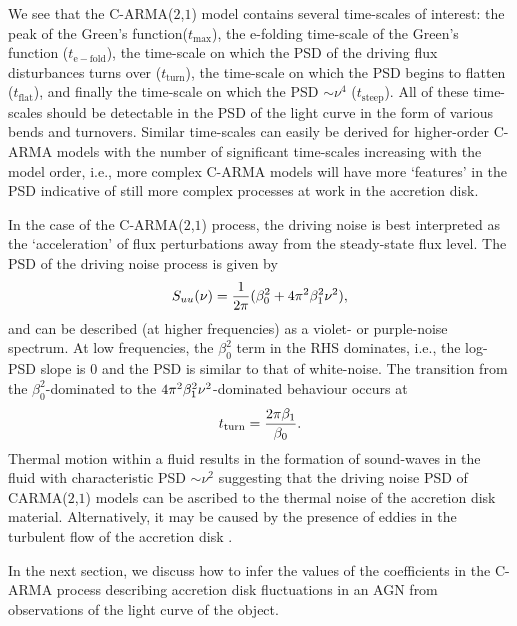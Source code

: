 \documentclass[a4paper,fleqn,usenatbib]{mnras}
\begin{document}
We see that the C-ARMA($2$,$1$) model contains several time-scales of interest: the peak of the Green's function($t_{\mathrm{max}}$), the e-folding time-scale of the Green's function ($t_{\mathrm{e-fold}}$), the time-scale on which the PSD of the driving flux disturbances turns over ($t_{\mathrm{turn}}$), the time-scale on which the PSD begins to flatten ($t_{\mathrm{flat}}$), and finally the time-scale on which the PSD $\sim \nu^{4}$ ($t_{\mathrm{steep}}$). All of these time-scales should be detectable in the PSD of the light curve in the form of various bends and turnovers. Similar time-scales can easily be derived for higher-order C-ARMA models with the number of significant time-scales increasing with the model order, i.e., more complex C-ARMA models will have more `features' in the PSD indicative of still more complex processes at work in the accretion disk.

In the case of the C-ARMA($2$,$1$) process, the driving noise is best interpreted as the `acceleration' of flux perturbations away from the steady-state flux level. The PSD of the driving noise process is given by
\begin{equation}\label{eq:CARMA21distPSD}
S_{uu}(\nu) = \frac{1}{2 \pi}(\beta_{0}^{2} + 4 \pi^{2} \beta_{1}^{2} \nu^{2}),
\end{equation}
and can be described (at higher frequencies) as a violet- or purple-noise spectrum. At low frequencies, the $\beta_{0}^{2}$ term in the RHS dominates, i.e., the log-PSD slope is $0$ and the PSD is similar to that of white-noise. The transition from the $\beta_{0}^{2}$-dominated to the $4 \pi^{2} \beta_{1}^{2} \nu^{2}$-dominated behaviour occurs at
\begin{equation}\label{eq:distPSDTurnover}
t_{\mathrm{turn}} = \frac{2 \pi \beta_{1}}{\beta_{0}}.
\end{equation}
Thermal motion within a fluid results in the formation of sound-waves in the fluid with characteristic PSD $\sim \nu^{{2}}$ \citep{Mellen52} suggesting that the driving noise PSD of CARMA($2$,$1$) models can be ascribed to the thermal noise of the accretion disk material. Alternatively, it may be caused by the presence of eddies in the turbulent flow of the accretion disk \citep{EddySim15}.

In the next section, we discuss how to infer the values of the coefficients in the C-ARMA process describing accretion disk fluctuations in an AGN from observations of the light curve of the object.

\end{document}
